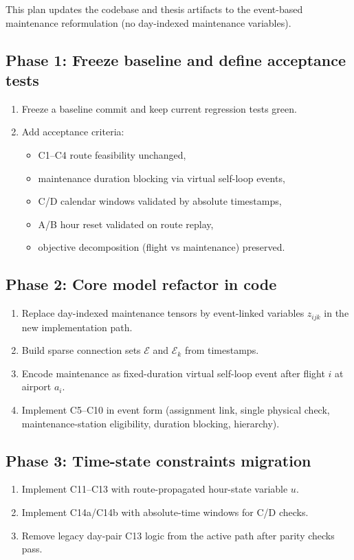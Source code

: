 \documentclass[11pt,a4paper]{article}
\newcommand{\Eset}{\mathcal{E}}
\begin{document}
This plan updates the codebase and thesis artifacts to the event-based
maintenance reformulation (no day-indexed maintenance variables).

\subsection*{Phase 1: Freeze baseline and define acceptance tests}
\begin{enumerate}
  \item Freeze a baseline commit and keep current regression tests green.
  \item Add acceptance criteria:
  \begin{itemize}
    \item C1--C4 route feasibility unchanged,
    \item maintenance duration blocking via virtual self-loop events,
    \item C/D calendar windows validated by absolute timestamps,
    \item A/B hour reset validated on route replay,
    \item objective decomposition (flight vs maintenance) preserved.
  \end{itemize}
\end{enumerate}

\subsection*{Phase 2: Core model refactor in code}
\begin{enumerate}
  \item Replace day-indexed maintenance tensors by event-linked variables
  $z_{ijk}$ in the new implementation path.
  \item Build sparse connection sets $\Eset$ and $\Eset_k$ from timestamps.
  \item Encode maintenance as fixed-duration virtual self-loop event after
  flight $i$ at airport $a_i$.
  \item Implement C5--C10 in event form (assignment link, single physical
  check, maintenance-station eligibility, duration blocking, hierarchy).
\end{enumerate}

\subsection*{Phase 3: Time-state constraints migration}
\begin{enumerate}
  \item Implement C11--C13 with route-propagated hour-state variable $u$.
  \item Implement C14a/C14b with absolute-time windows for C/D checks.
  \item Remove legacy day-pair C13 logic from the active path after parity
  checks pass.
\end{enumerate}
\end{document}
